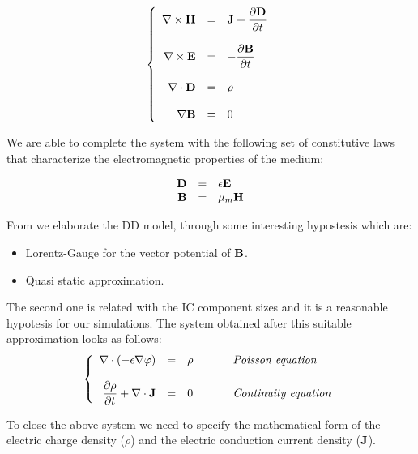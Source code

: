 \begin{equation}
\label{eq: Maxwell system}
\left\{
\begin{array}{rcl}
\nabla \times \mathbf{H} & = & \mathbf{J} + \dfrac{\partial \mathbf{D}}{\partial t} \\ \\
\nabla \times \mathbf{E} & = & - \dfrac{\partial \mathbf{B}}{\partial t} \\ \\
\nabla \cdot \mathbf{D} & = & \rho \\ \\
\nabla \mathbf{B} &  = & 0
\end{array}
\right.
\end{equation}

We are able to complete the system with the following set of constitutive laws that characterize the electromagnetic properties of the medium:

\begin{equation}
\begin{array}{rcl}
\mathbf{D} & = & \epsilon \mathbf{E} \\
\mathbf{B} & = & \mu_m \mathbf{H}
\end{array}
\end{equation}

From  we elaborate the DD model, through some interesting hypostesis which are:
\begin{itemize}
\item Lorentz-Gauge for the vector potential of $\mathbf{B}$.
\item Quasi static approximation.
\end{itemize}

The second one is related with the IC component sizes and it is a reasonable hypotesis for our simulations.	
The system obtained after this suitable approximation looks as follows:
\begin{equation}
\left\{
\begin{array}{rcll}
\nabla \cdot (-\epsilon \nabla \varphi) & = & \rho &\psp{15} \textit{Poisson equation}\\ \\
\dfrac{\partial \rho}{\partial t} + \nabla \cdot \vect{J} & = & 0 &\psp{15} \textit{Continuity equation}\\
\end{array}
\right.
\end{equation} 




To close the above system we need to specify the mathematical form of the electric charge density ($\rho$) and the electric conduction current density ($\mathbf{J}$).

